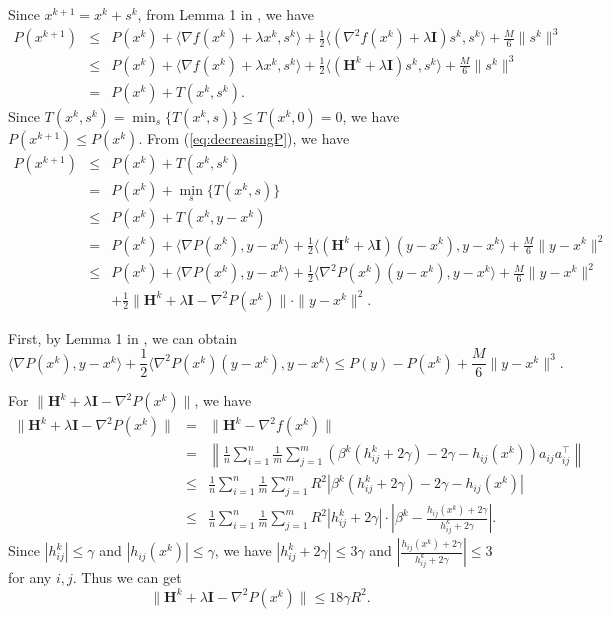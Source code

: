 \documentclass[10pt]{article}
\newcommand{\newalpha}{h}
\newcommand{\mH}{\mathbf{H}}
\newcommand{\mI}{\mathbf{I}}
\begin{document}
Since $x^{k+1} = x^k + s^k$, from Lemma 1 in \citep{PN2006-cubic}, we have 
\begin{eqnarray}
P(x^{k+1}) &\leq& P(x^k) + \langle \nabla f(x^k) + \lambda x^k, s^k \rangle + \frac{1}{2} \langle (\nabla^2 f(x^k) + \lambda \mI)s^k, s^k \rangle + \frac{M}{6}\|s^k\|^3 \nonumber \\ 
&\leq&  P(x^k) + \langle \nabla f(x^k) + \lambda x^k, s^k \rangle + \frac{1}{2} \langle (\mH^k + \lambda \mI)s^k, s^k \rangle + \frac{M}{6}\|s^k\|^3 \nonumber \\ 
&=& P(x^k) + T(x^k, s^k). \label{eq:decreasingP}
\end{eqnarray}
Since $T(x^k, s^k) = \min_{s}\{  T(x^k, s)  \} \leq T(x^k, 0)=0$, we have $P(x^{k+1}) \leq P(x^k)$.  From (\ref{eq:decreasingP}), we have 
\begin{eqnarray*}
	P(x^{k+1}) &\leq& P(x^k) + T(x^k, s^k)\\
	&=& P(x^k) + \min_{s}\{  T(x^k, s)  \}  \\ 
	&\leq& P(x^k) + T(x^k, y - x^k) \\ 
	&=& P(x^k) + \langle \nabla P(x^k), y-x^k \rangle + \frac{1}{2} \langle (\mH^k + \lambda \mI)(y-x^k), y-x^k \rangle + \frac{M}{6}\|y-x^k\|^2 \\ 
	&\leq& P(x^k) + \langle \nabla P(x^k), y-x^k \rangle + \frac{1}{2} \langle \nabla^2 P(x^k)(y-x^k), y-x^k \rangle + \frac{M}{6}\|y-x^k\|^2\\ 
	&& + \frac{1}{2} \|\mH^k + \lambda \mI - \nabla^2 P(x^k)\| \cdot \|y-x^k\|^2. 
\end{eqnarray*}

First, by Lemma 1 in \citep{PN2006-cubic}, we can obtain 
$$
\langle \nabla P(x^k), y-x^k \rangle + \frac{1}{2} \langle \nabla^2 P(x^k)(y-x^k), y-x^k \rangle \leq P(y) - P(x^k) + \frac{M}{6}\|y-x^k\|^3. 
$$

For $ \|\mH^k + \lambda \mI - \nabla^2 P(x^k)\| $, we have 
\begin{eqnarray*}
	\|\mH^k + \lambda \mI - \nabla^2 P(x^k)\| &=& \|\mH^k - \nabla^2 f(x^k)\| \\
	&=& \left\| \frac{1}{n} \sum_{i=1}^n \frac{1}{m} \sum_{j=1}^m \left(  \beta^k (h_{ij}^k + 2\gamma) - 2\gamma - \newalpha_{ij}(x^k)  \right)a_{ij}a_{ij}^\top \right\| \\ 
	&\leq&  \frac{1}{n} \sum_{i=1}^n \frac{1}{m} \sum_{j=1}^m R^2 \left| \beta^k (h_{ij}^k + 2\gamma) - 2\gamma - \newalpha_{ij}(x^k) \right| \\ 
	&\leq&  \frac{1}{n} \sum_{i=1}^n \frac{1}{m} \sum_{j=1}^m R^2 \left| h_{ij}^k + 2\gamma   \right| \cdot \left| \beta^k  - \frac{\newalpha_{ij}(x^k) + 2\gamma}{h_{ij}^k + 2\gamma} \right|. 
\end{eqnarray*}
Since $|h_{ij}^k| \leq \gamma$ and $|\newalpha_{ij}(x^k)| \leq \gamma$, we have $|h_{ij}^k + 2\gamma| \leq 3\gamma$ and $\left| \frac{\newalpha_{ij}(x^k) + 2\gamma}{h_{ij}^k + 2\gamma} \right| \leq 3$ for any $i,j$.  Thus we can get 
$$
\|\mH^k + \lambda \mI - \nabla^2 P(x^k)\| \leq 18\gamma R^2. 
$$
\end{document}
